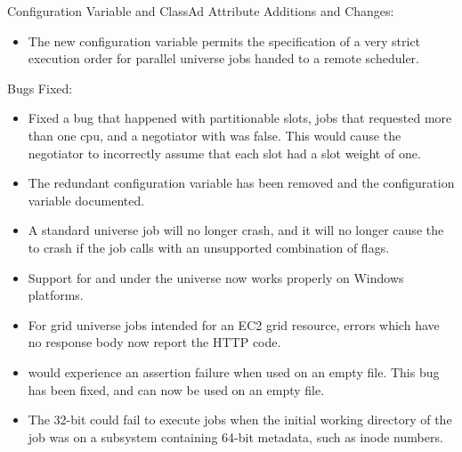 \noindent Configuration Variable and ClassAd Attribute Additions and Changes:

\begin{itemize}

\item The new configuration variable
permits the specification of a very strict execution order for 
parallel universe jobs handed to a remote scheduler.

\end{itemize}

\noindent Bugs Fixed:

\begin{itemize}

\item Fixed a bug that happened with partitionable slots, jobs that
requested more than one cpu, and a negotiator with
 was false.  This would
cause the negotiator to incorrectly assume that each slot had
a slot weight of one.

\item The redundant configuration variable  has
been removed and the configuration variable 
documented.

\item A standard universe job will no longer crash, and it will no longer 
cause the  to crash
if the job calls  with an unsupported combination of flags.

\item Support for  and  
under the  universe now works properly on Windows platforms.

\item For grid universe jobs intended for an EC2 grid resource,
errors which have no response body now report the HTTP code.

\item {}  would experience an assertion failure when
used on an empty file.  This bug has been fixed, and  can now be
used on an empty file.

\item The 32-bit  could fail to execute jobs when the initial
working directory of the job was on a subsystem containing 64-bit metadata,
such as inode numbers.


\end{itemize}
